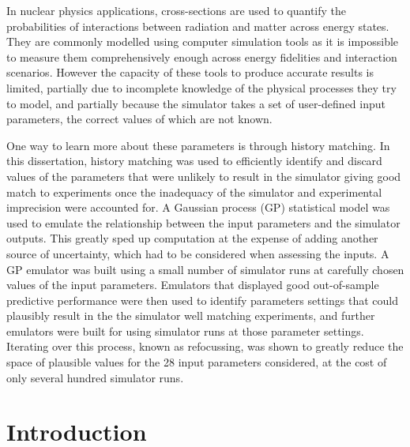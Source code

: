 \documentclass[
  12pt,
  a4paper,
  twoside]{book}
\begin{document}
In nuclear physics applications, cross-sections are used to quantify the probabilities of interactions between radiation and matter across energy states. They are commonly modelled using computer simulation tools as it is impossible to measure them comprehensively enough across energy fidelities and interaction scenarios. However the capacity of these tools to produce accurate results is limited, partially due to incomplete knowledge of the physical processes they try to model, and partially because the simulator takes a set of user-defined input parameters, the correct values of which are not known.

One way to learn more about these parameters is through history matching. In this dissertation, history matching was used to efficiently identify and discard values of the parameters that were unlikely to result in the simulator giving good match to experiments once the inadequacy of the simulator and experimental imprecision were accounted for. A Gaussian process (GP) statistical model was used to emulate the relationship between the input parameters and the simulator outputs. This greatly sped up computation at the expense of adding another source of uncertainty, which had to be considered when assessing the inputs. A GP emulator was built using a small number of simulator runs at carefully chosen values of the input parameters. Emulators that displayed good out-of-sample predictive performance were then used to identify parameters settings that could plausibly result in the the simulator well matching experiments, and further emulators were built for using simulator runs at those parameter settings. Iterating over this process, known as refocussing, was shown to greatly reduce the space of plausible values for the 28 input parameters considered, at the cost of only several hundred simulator runs.

\tableofcontents

\fancyhead{}
\fancyfoot{}
\pagestyle{fancy}
\fancyhead[RO,LE]{\thepage}
\fancyhead[LO,RE]{\rightmark}

\newcommand{\studentcomment}[1]{\todo[inline, backgroundcolor=blue!30]{\textsc{Student:} #1}}
\newcommand{\DSWcomment}[1]{\todo[inline, backgroundcolor=green!30]{\textsc{DSW:} #1}}
\newcommand{\supcomment}[1]{\todo[inline, backgroundcolor=red!30]{\textsc{Supervisor:} #1}}

\mainmatter

\hypertarget{Intro}{%
\chapter{Introduction}\label{Intro}}
\end{document}

